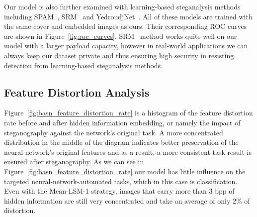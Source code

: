 Our model is also further examined with learning-based steganalysis methods including SPAM~\cite{SPAM}, SRM~\cite{SRM} and YedroudjNet~\cite{Yedroudj}. All of these models are trained with the same cover and embedded images as ours. Their corresponding ROC curves are shown in Figure~\ref{fig:roc_curves}. SRM~\cite{SRM} method works quite well on our model with a larger payload capacity, however in real-world applications we can always keep our dataset private and thus ensuring high security in resisting detection from learning-based steganalysis methods.

\figureROCCurves%

\subsection{Feature Distortion Analysis}

Figure~\ref{fig:basn_feature_distortion_rate} is a histogram of the feature distortion rate before and after hidden information embedding, or namely the impact of steganography against the network's original task. A more concentrated distribution in the middle of the diagram indicates better preservation of the neural network's original features and as a result, a more consistent task result is ensured after steganography. As we can see in Figure~\ref{fig:basn_feature_distortion_rate} our model has little influence on the targeted neural-network-automated tasks, which in this case is classification. Even with the Mean-LSM-1 strategy, images that carry more than 3 bpp of hidden information are still very concentrated and take an average of only 2\% of distortion.

\figureBASNFeatureDistortionRate%
